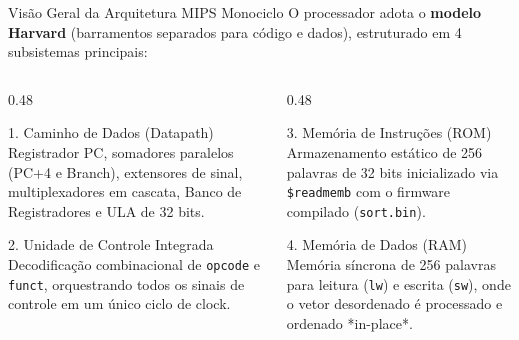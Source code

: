 \documentclass[aspectratio=169, 11pt]{beamer}
\begin{document}
\begin{frame}{Visão Geral da Arquitetura MIPS Monociclo}
  O processador adota o \textbf{modelo Harvard} (barramentos separados para código e dados), estruturado em 4 subsistemas principais:

  \vspace{0.3cm}
  \begin{columns}[T]
    \begin{column}{0.48\textwidth}
      \begin{block}{1. Caminho de Dados (Datapath)}
        \small
        Registrador PC, somadores paralelos (PC+4 e Branch), extensores de sinal, multiplexadores em cascata, Banco de Registradores e ULA de 32 bits.
      \end{block}
      \vspace{0.2cm}
      \begin{block}{2. Unidade de Controle Integrada}
        \small
        Decodificação combinacional de \texttt{opcode} e \texttt{funct}, orquestrando todos os sinais de controle em um único ciclo de clock.
      \end{block}
    \end{column}

    \begin{column}{0.48\textwidth}
      \begin{exampleblock}{3. Memória de Instruções (ROM)}
        \small
        Armazenamento estático de 256 palavras de 32 bits inicializado via \texttt{\$readmemb} com o firmware compilado (\texttt{sort.bin}).
      \end{exampleblock}
      \vspace{0.2cm}
      \begin{exampleblock}{4. Memória de Dados (RAM)}
        \small
        Memória síncrona de 256 palavras para leitura (\texttt{lw}) e escrita (\texttt{sw}), onde o vetor desordenado é processado e ordenado *in-place*.
      \end{exampleblock}
    \end{column}
  \end{columns}
\end{frame}
\end{document}
